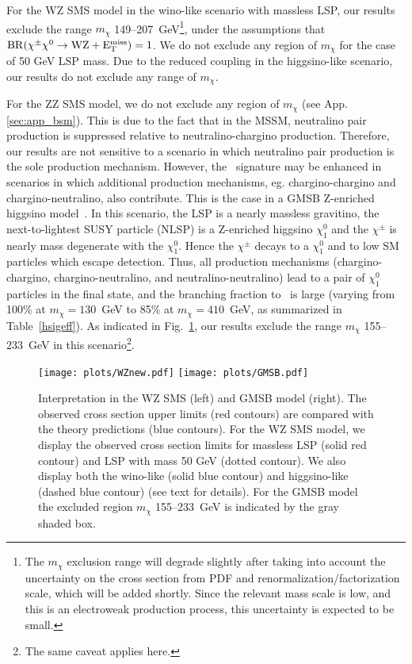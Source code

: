 For the WZ SMS model in the wino-like scenario with massless LSP, our results exclude the range $m_{\chi}$ 
149--207~GeV\footnote{The $m_\chi$ exclusion range will degrade slightly after taking into account the uncertainty on the cross section
from PDF and renormalization/factorization scale, which will be added shortly. Since the relevant mass scale is low, and this is an electroweak production
process, this uncertainty is expected to be small.}, under the assumptions that
$\rm{BR}(\chi^{\pm}\chi^{0}\to \rm{WZ}+\rm{E_{T}^{miss}})=1$.
We do not exclude any region of $m_{\chi}$ for the case of 50 GeV LSP mass.
Due to the reduced coupling in the higgsino-like scenario, our results do not exclude any range of $m_\chi$.

For the ZZ SMS model, we do not exclude any region of $m_{\chi}$ (see App. \ref{sec:app_bsm}).
This is due to the fact that in the MSSM, neutralino pair production is suppressed relative to neutralino-chargino production.
Therefore, our results are not sensitive to a scenario in which neutralino pair production is the sole production mechanism.
However, the \zzmet\ signature may be enhanced in scenarios in which additional production mechanisms, eg. chargino-chargino and chargino-neutralino,
also contribute. This is the case in a GMSB Z-enriched higgsino model~\cite{ref:ewkino}. In this scenario, the LSP is a nearly massless
gravitino, the next-to-lightest SUSY particle (NLSP) is a Z-enriched higgsino $\chi^0_1$ and the $\chi^{\pm}$ is nearly mass degenerate with the $\chi^{0}_{1}$. 
Hence the $\chi^{\pm}$ decays to a $\chi^{0}_{1}$ and to low \pt SM particles which escape detection. Thus, all production mechanisms
(chargino-chargino, chargino-neutralino, and neutralino-neutralino) lead to a pair of $\chi^{0}_{1}$ particles in the final state, and the branching fraction
to \zzmet\ is large (varying from 100\% at $m_\chi=130$~GeV to 85\% at $m_\chi=410$~GeV, as summarized in Table~\ref{hsigeff}).
As indicated in Fig.~\ref{fig:limits}, our results exclude the range  $m_{\chi}$ 155--233~GeV
in this scenario\footnote{The same caveat applies here.}.

\begin{figure}[th!]
  \begin{center}
    \texttt{[image: plots/WZnew.pdf]}
    \texttt{[image: plots/GMSB.pdf]}
    \caption{
      Interpretation in the WZ SMS (left) %
	  and GMSB model (right). %
      The observed cross section upper limits (red contours) are compared with the theory predictions (blue contours).
      For the WZ %
	  SMS model, %
	  we display the observed cross section limits for massless LSP (solid red contour) and LSP with mass 50 GeV (dotted contour).
	  We also
	  display both the wino-like (solid blue contour) and higgsino-like (dashed blue contour) (see text for details).
      For the GMSB model the excluded region $m_{\chi}$ 155--233~GeV is indicated by the gray shaded box.
      \label{fig:limits}
    }
  \end{center}
\end{figure}


